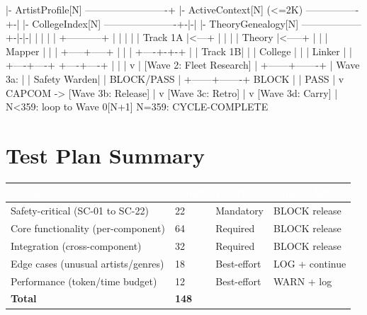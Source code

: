 \documentclass[11pt,letterpaper]{article}
\newcommand{\tblhdr}[1]{\textbf{\sffamily\textcolor{white}{#1}}}
\begin{document}
\begin{asciibox}
   |- ArtistProfile[N] -------------------------+
   |- ActiveContext[N] (<=2K) ----------------+-|
   |- CollegeIndex[N] ----------------------+-|-|
   |- TheoryGenealogy[N] ------------------+-|-|-|
                                           | | | |
                         +-----------+    | | | |
                         | Track 1A  |<---+ | | |
                         | Theory    |<-----+ | |
                         | Mapper    |        | |
                         +-----+-----+        | |
                               |         +----+-+-+
                               |         | Track 1B|
                               |         | College |
                               |         | Linker  |
                               |         +----+----+
                               +----+----+    |
                                    |         |
                                    v         |
                              [Wave 2: Fleet Research]
                                    |
                             +------+-------+
                             | Wave 3a:     |
                             | Safety Warden|
                             | BLOCK/PASS   |
                             +------+-------+
                          BLOCK |   | PASS
                                |   v
                      CAPCOM -> [Wave 3b: Release]
                                    |
                                    v
                             [Wave 3c: Retro]
                                    |
                                    v
                             [Wave 3d: Carry]
                                    |
                          N<359: loop to Wave 0[N+1]
                          N=359: CYCLE-COMPLETE
\end{asciibox}

\section{Test Plan Summary}

\begin{center}
\begin{tabularx}{\textwidth}{L{5cm}C{1.5cm}L{2.5cm}X}
\toprule
{}
\tblhdr{Category} & \tblhdr{Count} & \tblhdr{Priority} & \tblhdr{Failure Action} \\
\midrule
Safety-critical (SC-01 to SC-22) & 22 & Mandatory & BLOCK release \\
Core functionality (per-component) & 64 & Required & BLOCK release \\
Integration (cross-component) & 32 & Required & BLOCK release \\
Edge cases (unusual artists/genres) & 18 & Best-effort & LOG + continue \\
Performance (token/time budget) & 12 & Best-effort & WARN + log \\
\midrule
{}
\textbf{Total} & \textbf{148} & & \\
\bottomrule
\end{tabularx}
\end{center}
\end{document}
